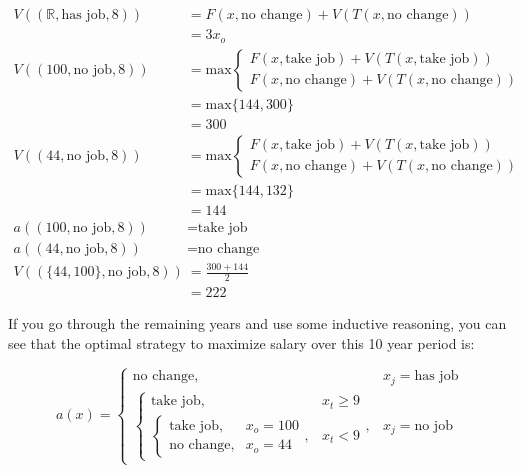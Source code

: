 \documentclass[a4paper, 12pt]{article}
\begin{document}
\[
\begin{aligned}
  V((\mathbb{R}, \text{has job}, 8)) &= F(x, \text{no change}) + V(T(x, \text{no change})) \\
                                &= 3x_{o} \\
  V((100, \text{no job}, 8)) &= \text{max} \begin{cases}
    F(x, \text{take job}) + V(T(x, \text{take job})) \\
    F(x, \text{no change}) + V(T(x, \text{no change}))
  \end{cases} \\
                             &= \text{max}\{144, 300\} \\
                             &= 300 \\
  V((44, \text{no job}, 8)) &= \text{max} \begin{cases}
    F(x, \text{take job}) + V(T(x, \text{take job})) \\
    F(x, \text{no change}) + V(T(x, \text{no change}))
  \end{cases} \\
                             &= \text{max}\{144, 132\} \\
                             &= 144 \\
    a((100, \text{no job}, 8)) &= \text{take job} \\
    a((44, \text{no job}, 8)) &= \text{no change} \\
    V((\{44, 100\}, \text{no job}, 8)) &= \frac{300+144}{2} \\
                                       &= 222
\end{aligned}
\]

If you go through the remaining years and use some inductive
reasoning, you can see that the optimal strategy to maximize
salary over this 10 year period is:

\[
  a(x) = \begin{cases}
    \text{no change}, & x_{j} = \text{has job} \\
    \begin{cases}
      \text{take job}, & x_{t} \geq 9 \\
      \begin{cases}
        \text{take job}, & x_{o} = 100 \\
        \text{no change}, & x_{o} = 44
      \end{cases}, & x_{t} < 9
    \end{cases}, & x_{j} = \text{no job}
  \end{cases}
\]
\end{document}
